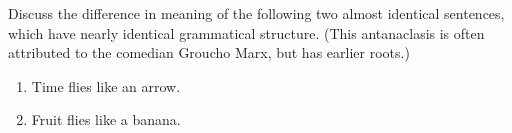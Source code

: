 Discuss the difference in meaning of the following two almost identical sentences, which have nearly identical grammatical structure.  (This antanaclasis is often attributed to the comedian Groucho Marx, but has earlier roots.)
\begin{enumerate}
\item Time flies like an arrow.
\item Fruit flies like a banana.
\end{enumerate}